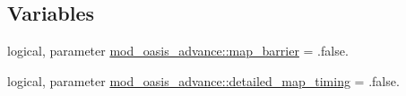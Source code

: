 \subsection*{Variables}
\begin{DoxyCompactItemize}
\item 
logical, parameter \hyperlink{namespacemod__oasis__advance_ac617024af9299c27eaeb9156f647b028}{mod\+\_\+oasis\+\_\+advance\+::map\+\_\+barrier} = .false.
\item 
logical, parameter \hyperlink{namespacemod__oasis__advance_aad8e5c2e16b0270a7da0800a14ae1e07}{mod\+\_\+oasis\+\_\+advance\+::detailed\+\_\+map\+\_\+timing} = .false.
\end{DoxyCompactItemize}
